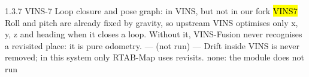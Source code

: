 \begin{frame}{1.3.7 \;VINS-7 \;Loop closure and pose graph: in VINS, but not in our fork}
  \hl{VINS7}
  {Roll and pitch are already fixed by gravity, so upstream VINS optimises only
   x, y, z and heading when it closes a loop.}
  {Without it, VINS-Fusion never recognises a revisited place: it is pure odometry.}
  {--- (not run)}
  {---}
  {Drift inside VINS is never removed; in this system only RTAB-Map uses revisits.}
  {none: the module does not run}
\end{frame}

